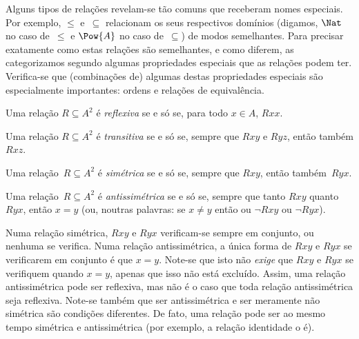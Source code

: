 \documentclass[../../../include/open-logic-section]{subfiles}
\begin{document}

\begin{intro}
Alguns tipos de relações revelam-se tão comuns que receberam nomes especiais.
Por exemplo, $\le$ e~$\subseteq$ relacionam
os seus respectivos domínios (digamos, $\Nat$ no caso de~$\le$ e
$\Pow{A}$ no caso de~$\subseteq$) de modos semelhantes. Para precisar
exatamente como estas relações são semelhantes, e como diferem,
as categorizamos segundo algumas propriedades especiais que as relações
podem ter. Verifica-se que (combinações de) algumas destas propriedades
especiais são especialmente importantes: ordens e relações de equivalência.
\end{intro}

\begin{defn}[Reflexividade]
Uma relação $R \subseteq A^2$ é \emph{reflexiva} se e só se, para todo $x \in
A$, $Rxx$.
\end{defn}

\begin{defn}[Transitividade]
Uma relação $R \subseteq A^2$ é \emph{transitiva} se e só se, sempre que $Rxy$
e $Ryz$, então também $Rxz$.
\end{defn}

\begin{defn}[Simetria]
Uma relação~$R \subseteq A^2$ é \emph{simétrica} se e só se, sempre que
$Rxy$, então também~$Ryx$.
\end{defn}

\begin{defn}[Antissimetria]
Uma relação~$R \subseteq A^2$ é \emph{antissimétrica} se e só se, sempre que tanto
$Rxy$ quanto $Ryx$, então $x=y$ (ou, noutras palavras: se $x\neq y$ então
ou $\lnot Rxy$ ou $\lnot Ryx$).
\end{defn}

\begin{explain}
Numa relação simétrica, $Rxy$ e $Ryx$ verificam-se sempre em conjunto, ou
nenhuma se verifica. Numa relação antissimétrica, a única forma de $Rxy$
e $Ryx$ se verificarem em conjunto é que $x = y$. Note-se que isto não
\emph{exige} que $Rxy$ e $Ryx$ se verifiquem quando $x = y$, apenas que isso
não está excluído. Assim, uma relação antissimétrica pode ser reflexiva, mas
não é o caso que toda relação antissimétrica seja
reflexiva. Note-se também que ser antissimétrica e ser meramente não simétrica
são condições diferentes. De fato, uma relação pode ser ao mesmo tempo
simétrica e antissimétrica (por exemplo, a relação identidade o é).
\end{explain}
\end{document}
